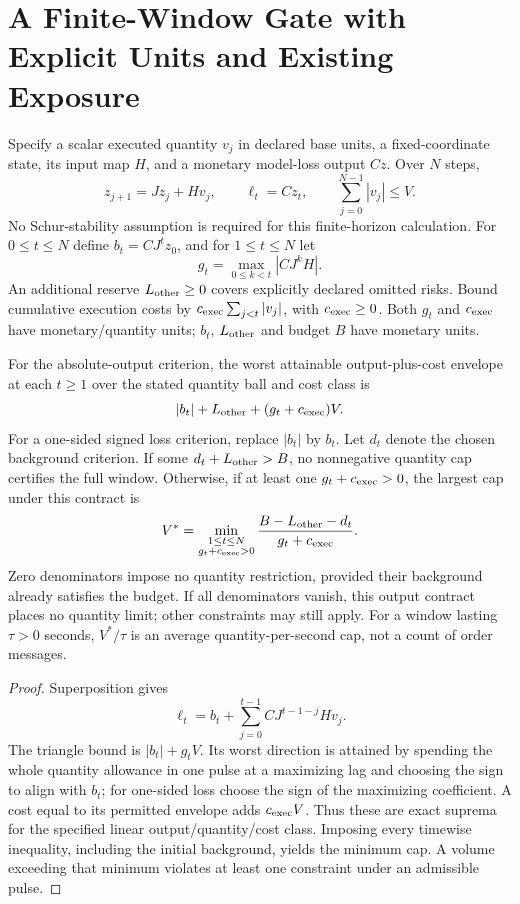 
\section{A Finite-Window Gate with Explicit Units and Existing Exposure}
Specify a scalar executed quantity $v_j$ in declared base units, a fixed-coordinate state, its input map $H$, and a monetary model-loss output $Cz$. Over $N$ steps,
\[
z_{j+1}=Jz_j+Hv_j,\qquad \ell_t=Cz_t,\qquad
\sum_{j=0}^{N-1}|v_j|\le V.
\]
No Schur-stability assumption is required for this finite-horizon calculation. For $0\le t\le N$ define $b_t=CJ^tz_0$, and for $1\le t\le N$ let
\[
g_t=\max_{0\le k<t}|CJ^kH|.
\]
An additional reserve $L_{\rm other}\ge0$ covers explicitly declared omitted risks. Bound cumulative execution costs by $c_{\rm exec}\sum_{j<t}|v_j|$, with $c_{\rm exec}\ge0$. Both $g_t$ and $c_{\rm exec}$ have monetary/quantity units; $b_t$, $L_{\rm other}$ and budget $B$ have monetary units.

\begin{proposition}
For the absolute-output criterion, the worst attainable output-plus-cost envelope at each $t\ge1$ over the stated quantity ball and cost class is
\[
|b_t|+L_{\rm other}+(g_t+c_{\rm exec})V.
\]
For a one-sided signed loss criterion, replace $|b_t|$ by $b_t$. Let $d_t$ denote the chosen background criterion. If some $d_t+L_{\rm other}>B$, no nonnegative quantity cap certifies the full window. Otherwise, if at least one $g_t+c_{\rm exec}>0$, the largest cap under this contract is
\[
V^*=\min_{\substack{1\le t\le N\\g_t+c_{\rm exec}>0}}
\frac{B-L_{\rm other}-d_t}{g_t+c_{\rm exec}}.
\]
Zero denominators impose no quantity restriction, provided their background already satisfies the budget. If all denominators vanish, this output contract places no quantity limit; other constraints may still apply. For a window lasting $\tau>0$ seconds, $V^*/\tau$ is an average quantity-per-second cap, not a count of order messages.
\end{proposition}
\begin{proof}
Superposition gives
\[
\ell_t=b_t+\sum_{j=0}^{t-1}CJ^{t-1-j}Hv_j.
\]
The triangle bound is $|b_t|+g_tV$. Its worst direction is attained by spending the whole quantity allowance in one pulse at a maximizing lag and choosing the sign to align with $b_t$; for one-sided loss choose the sign of the maximizing coefficient. A cost equal to its permitted envelope adds $c_{\rm exec}V$. Thus these are exact suprema for the specified linear output/quantity/cost class. Imposing every timewise inequality, including the initial background, yields the minimum cap. A volume exceeding that minimum violates at least one constraint under an admissible pulse.
\end{proof}

